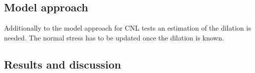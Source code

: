 \subsection{Model approach}
Additionally to the model approach for CNL tests an estimation of the dilation is needed. The normal stress has to be updated once the dilation is known.\\

\subsection{Results and discussion}

